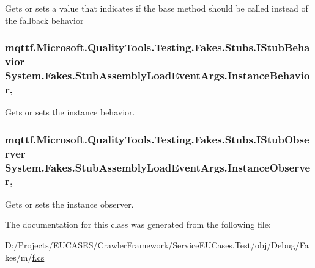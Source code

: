 Gets or sets a value that indicates if the base method should be called instead of the fallback behavior

\hypertarget{class_system_1_1_fakes_1_1_stub_assembly_load_event_args_a31105229fe08c957c5303797e52c081c}{
\subsubsection[{Instance\-Behavior}]{\setlength{\rightskip}{0pt plus 5cm}mqttf.\-Microsoft.\-Quality\-Tools.\-Testing.\-Fakes.\-Stubs.\-I\-Stub\-Behavior System.\-Fakes.\-Stub\-Assembly\-Load\-Event\-Args.\-Instance\-Behavior\hspace{0.3cm}{\ttfamily [get]}, {\ttfamily [set]}}}\label{class_system_1_1_fakes_1_1_stub_assembly_load_event_args_a31105229fe08c957c5303797e52c081c}


Gets or sets the instance behavior.

\hypertarget{class_system_1_1_fakes_1_1_stub_assembly_load_event_args_af7c5cb32615e755de51b272eaa3a7ad3}{
\subsubsection[{Instance\-Observer}]{\setlength{\rightskip}{0pt plus 5cm}mqttf.\-Microsoft.\-Quality\-Tools.\-Testing.\-Fakes.\-Stubs.\-I\-Stub\-Observer System.\-Fakes.\-Stub\-Assembly\-Load\-Event\-Args.\-Instance\-Observer\hspace{0.3cm}{\ttfamily [get]}, {\ttfamily [set]}}}\label{class_system_1_1_fakes_1_1_stub_assembly_load_event_args_af7c5cb32615e755de51b272eaa3a7ad3}


Gets or sets the instance observer.



The documentation for this class was generated from the following file\-:\begin{DoxyCompactItemize}
\item 
D\-:/\-Projects/\-E\-U\-C\-A\-S\-E\-S/\-Crawler\-Framework/\-Service\-E\-U\-Cases.\-Test/obj/\-Debug/\-Fakes/m/\hyperlink{m_2f_8cs}{f.\-cs}\end{DoxyCompactItemize}
